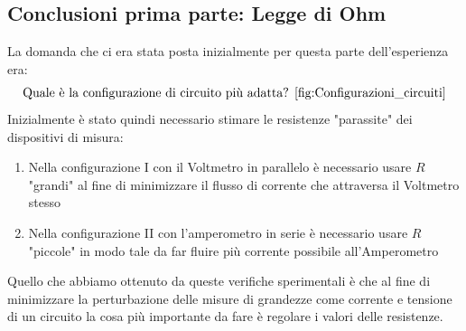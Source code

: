\documentclass[letterpaper,12pt]{article}
\begin{document}
\subsection{Conclusioni prima parte: Legge di Ohm}
La domanda che ci era stata posta inizialmente per questa parte dell'esperienza era: 
$$\text{Quale è la configurazione di circuito più adatta? \ref{fig:Configurazioni_circuiti}}$$ 
Inizialmente è stato quindi necessario stimare le resistenze "parassite" dei dispositivi di misura:
\renewcommand{\labelitemi}{-}
\begin{enumerate}
    \item Nella configurazione I con il Voltmetro in parallelo è necessario usare $R$ "grandi" al fine di minimizzare il flusso di corrente che attraversa il Voltmetro stesso
    \item Nella configurazione II con l'amperometro in serie è necessario usare $R$ "piccole" in modo tale da far fluire più corrente possibile all'Amperometro
\end{enumerate}
Quello che abbiamo ottenuto da queste verifiche sperimentali è che al fine di minimizzare la perturbazione delle misure di grandezze come corrente e tensione di un circuito la cosa più importante da fare è regolare i valori delle resistenze. 
\end{document}
